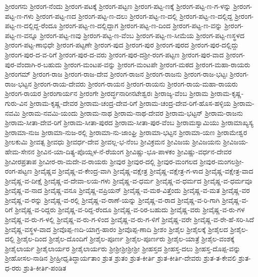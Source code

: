 ಶ್ರೀರಂಗನು
ಶ್ರೀರಂಗ-ನೆಂದು
ಶ್ರೀರಂಗ-ಪಟಕ್ಕೆ
ಶ್ರೀರಂಗ-ಪಟ್ಟಣ
ಶ್ರೀರಂಗ-ಪಟ್ಟ-ಣಕ್ಕೆ
ಶ್ರೀರಂಗ-ಪಟ್ಟ-ಣ-ಗ-ಳನ್ನು
ಶ್ರೀರಂಗ-ಪಟ್ಟ-ಣ-ಗಳು
ಶ್ರೀರಂಗ-ಪಟ್ಟ-ಣದ
ಶ್ರೀರಂಗ-ಪಟ್ಟ-ಣ-ದಲು
ಶ್ರೀರಂಗ-ಪಟ್ಟ-ಣ-ದಲ್ಲಿ
ಶ್ರೀರಂಗ-ಪಟ್ಟ-ಣ-ದಲ್ಲಿದ್ದ
ಶ್ರೀರಂಗ-ಪಟ್ಟ-ಣ-ದಲ್ಲಿದ್ದ-ರೆಂದೂ
ಶ್ರೀರಂಗ-ಪಟ್ಟ-ಣ-ದಲ್ಲಿದ್ದಾಗ
ಶ್ರೀರಂಗ-ಪಟ್ಟ-ಣ-ದಿಂದ
ಶ್ರೀರಂಗ-ಪಟ್ಟ-ಣ-ವನ್ನು
ಶ್ರೀರಂಗ-ಪಟ್ಟ-ಣ-ವನ್ನೂ
ಶ್ರೀರಂಗ-ಪಟ್ಟ-ಣವು
ಶ್ರೀರಂಗ-ಪಟ್ಟ-ಣ-ವೆಂಬ
ಶ್ರೀರಂಗ-ಪಟ್ಟ-ಣ-ಸೀಮೆಯ
ಶ್ರೀರಂಗ-ಪಟ್ಟ-ಣಸ್ಥಳದ
ಶ್ರೀರಂಗ-ಪಟ್ಟ-ಣಾಭಿಧೇ
ಶ್ರೀರಂಗ-ಪಟ್ಟಣೇ
ಶ್ರೀರಂಗ-ಪುದ
ಶ್ರೀರಂಗ-ಪುರ
ಶ್ರೀರಂಗ-ಪುರದ
ಶ್ರೀರಂಗ-ಪುರ-ದಲ್ಲಿದ್ದು
ಶ್ರೀರಂಗ-ಪುರ-ದ-ವ-ರಿಗೆ
ಶ್ರೀರಂಗ-ಪುರ-ದ-ವರು
ಶ್ರೀರಂಗ-ಪುರ-ದಶ್ರೀ-ರಂಗ-ಪಟ್ಟಣ
ಶ್ರೀರಂಗ-ಪುರ-ವಾದ
ಶ್ರೀರಂಗ-ಪುರ-ವೆಂದಾಗಿ-ರ-ಬಹುದು
ಶ್ರೀರಂಗ-ಮಂಟಪ-ವನ್ನು
ಶ್ರೀರಂಗ-ಮಂಟಪೇ
ಶ್ರೀರಂಗ-ಮಠದ
ಶ್ರೀರಂಗ-ಮಹಾ-ರಾಯರು
ಶ್ರೀರಂಗಮ್
ಶ್ರೀರಂಗ-ರಾಜ
ಶ್ರೀರಂಗ-ರಾಜ-ದೇವ
ಶ್ರೀರಂಗ-ರಾಜನ
ಶ್ರೀರಂಗ-ರಾಜನು
ಶ್ರೀರಂಗ-ರಾಜ-ಭಟ್ಟಃ
ಶ್ರೀರಂಗ-ರಾಜ-ಭಟ್ಟನ
ಶ್ರೀರಂಗ-ರಾಯ-ದೇವರು
ಶ್ರೀರಂಗ-ರಾಯನ
ಶ್ರೀರಂಗ-ರಾಯನು
ಶ್ರೀರಂಗ-ರಾಯ-ಮಹಾ-ರಾಯರು
ಶ್ರೀರಂಗ-ರಾಯರ
ಶ್ರೀರಂಗಾರ್ಯನ
ಶ್ರೀರಂಗೇ
ಶ್ರೀರರ್ದ್ಧನಾರೀನಟೇಶ್ವರಃ
ಶ್ರೀರಾಜ್ಯ-ವೆಂಬ
ಶ್ರೀರಾಮ
ಶ್ರೀರಾಮ-ಕೃಷ್ಣ-ಗುರು-ವಿನ
ಶ್ರೀರಾಮ-ಕೃಷ್ಣ-ದೇವರ
ಶ್ರೀರಾಮ-ಚಂದ್ರ-ದೇವ-ರಿಗೆ
ಶ್ರೀರಾಮ-ಚಂದ್ರ-ದೇವ-ರಿಗೆ-ಹೊಸ-ಹಳ್ಳಿಯ
ಶ್ರೀರಾಮ-ನವಮಿ
ಶ್ರೀರಾಮ-ನವಮಿ-ಯಂದು
ಶ್ರೀರಾಮ-ನಾಥ
ಶ್ರೀರಾಮ-ನಾಥ-ದೇವರ
ಶ್ರೀರಾಮ-ಭಟ್ಟನ್
ಶ್ರೀರಾಮ-ರಾಜನು
ಶ್ರೀರಾಮ-ಸೀತಾ-ದೇವ-ರಿಗೆ
ಶ್ರೀರಾಮ-ಸೀತಾ-ಪುರದ
ಶ್ರೀರಾಮ-ಸೀತಾ-ಪುರ-ವೆಂಬ
ಶ್ರೀರಾಮಸ್ವಾಮಿಯು
ಶ್ರೀರಾಮಾಖ್ಯಸ್ಯ
ಶ್ರೀರಾಮಾ-ನುಜ
ಶ್ರೀರಾಮಾ-ನುಜ-ರಲ್ಲಿ
ಶ್ರೀರಾಮಾ-ನು-ಜಾಂಘ್ರಿ
ಶ್ರೀರಾಮಾ-ಭಟ್ಟನ
ಶ್ರೀರಾಮಾ-ಯಣ
ಶ್ರೀರಾಮೇಶ್ವರ
ಶ್ರೀಲಕುಮಿ
ಶ್ರೀವತ್ಸ
ಶ್ರೀವಧು
ಶ್ರೀವರ್ಧ-ದೇವ
ಶ್ರೀವಲ್ಲ-ಭ-ನೆಂಬ
ಶ್ರೀವಿಕ್ರಮನ
ಶ್ರೀವಿಜಯ
ಶ್ರೀವಿಜಯನು
ಶ್ರೀವಿಜಯ-ಹೇಮ-ಸೇನನ
ಶ್ರೀವಿನ-ಯಾ-ದಿತ್ಯ-ಪೊಯ್ಸಳ-ನೆ-ರೆಯಂಗ
ಶ್ರೀವಿಷ್ಣು-ಭೂ-ಪಾಳಕಂ
ಶ್ರೀವಿಷ್ಣು-ವರ್ಧನ-ದೇವರ
ಶ್ರೀವೀರಪ್ರತಾಪ
ಶ್ರೀವೀರ-ರಾ-ಮದೇ-ವ-ರಾಯರು
ಶ್ರೀವುರ
ಶ್ರೀವುರ-ದಲ್ಲಿ
ಶ್ರೀವುರ-ಮಂಗಲದ
ಶ್ರೀವುರ-ಮಂಗಲಶ್ರೀ-ರಂಗ-ಪಟ್ಟಣ
ಶ್ರೀವೈಷ್ಣವ
ಶ್ರೀವೈಷ್ಣ-ವ-ಕೇಂದ್ರ-ವಾಗಿ
ಶ್ರೀವೈಷ್ಣ-ವಕ್ಷೇತ್ರ
ಶ್ರೀವೈಷ್ಣ-ವಕ್ಷೇತ್ರ-ಗ-ಳಾದ
ಶ್ರೀವೈಷ್ಣ-ವಕ್ಷೇತ್ರ-ವಾದ
ಶ್ರೀವೈಷ್ಣ-ವ-ದೀಕ್ಷೆ
ಶ್ರೀವೈಷ್ಣ-ವ-ದೇವಾ-ಲಯ-ಗಳು
ಶ್ರೀವೈಷ್ಣ-ವ-ಧರ್ಮ
ಶ್ರೀವೈಷ್ಣ-ವ-ಧರ್ಮದ
ಶ್ರೀವೈಷ್ಣ-ವ-ಧರ್ಮವೂ
ಶ್ರೀವೈಷ್ಣ-ವ-ನಾದ
ಶ್ರೀವೈಷ್ಣ-ವನೂ
ಶ್ರೀವೈಷ್ಣ-ವಪ್ರಿಯನ್
ಶ್ರೀವೈಷ್ಣ-ವ-ಮಠ-ವಿತ್ತೆಂದು
ಶ್ರೀವೈಷ್ಣ-ವ-ಮತ
ಶ್ರೀವೈಷ್ಣ-ವರ
ಶ್ರೀವೈಷ್ಣ-ವ-ರನ್ನು
ಶ್ರೀವೈಷ್ಣ-ವ-ರಲ್ಲಿ
ಶ್ರೀವೈಷ್ಣ-ವ-ರಾಣೆ-ಯನ್ನು
ಶ್ರೀವೈಷ್ಣ-ವ-ರಾದ
ಶ್ರೀವೈಷ್ಣ-ವ-ರಿ-ಗಾಗಿ
ಶ್ರೀವೈಷ್ಣ-ವ-ರಿಗೆ
ಶ್ರೀವೈಷ್ಣ-ವ-ರಿದ್ದರು
ಶ್ರೀವೈಷ್ಣ-ವ-ರಿದ್ದ-ರೆಂದೂ
ಶ್ರೀವೈಷ್ಣ-ವ-ರಿರ-ಬಹುದು
ಶ್ರೀವೈಷ್ಣ-ವರು
ಶ್ರೀವೈಷ್ಣ-ವ-ರು-ಗಳ
ಶ್ರೀವೈಷ್ಣ-ವ-ರು-ಗ-ಳಲ್ಲಿ
ಶ್ರೀವೈಷ್ಣ-ವ-ರು-ಗ-ಳಿಂದ
ಶ್ರೀವೈಷ್ಣ-ವ-ರು-ಗ-ಳಿಗೆ
ಶ್ರೀವೈಷ್ಣ-ವರೇ
ಶ್ರೀವೈಷ್ಣ-ವ-ರೇ-ಹೆ-ಸರಿ-ಸಿದೆ
ಶ್ರೀವೈಷ್ಣ-ವಸ್ಥಳ-ವಾದ
ಶ್ರೀವೊಪ್ಪ-ಣದಿ-ಯಾಗ್ರ-ಹಾರಂ
ಶ್ರೀವೊಪ್ಪ-ಣಾದಿ
ಶ್ರೀಶಂ
ಶ್ರೀಶೈಲ
ಶ್ರೀಶೈಲಕ್ಕೆ
ಶ್ರೀಶೈಲದ
ಶ್ರೀಶೈಲ-ದಲ್ಲಿ
ಶ್ರೀಶೈಲ-ದಿಂದ
ಶ್ರೀಶೈಲ-ದೊಂದಿಗೆ
ಶ್ರೀಶೈಲ-ಪೂರ್ಣ
ಶ್ರೀಶೈಲ-ಪೂರ್ಣರು
ಶ್ರೀಶೈಲ-ಯಾತ್ರೆ
ಶ್ರೀಶೈಲ-ವಂಶಕ್ಕೆ
ಶ್ರೀಶೈಲಾರ್ಯ
ಶ್ರೀಶೈಲಾರ್ಯರ
ಶ್ರೀಶೈಲಾರ್ಯರು
ಶ್ರೀಶ್ರೀಶ್ರೀಶ್ರೀಶ್ರೀ
ಶ್ರೀಹಸ್ತದ
ಶ್ರೀಹಸ್ತ-ದಲು
ಶ್ರೀಹಸ್ತ-ದೊಪ್ಪ-ವನ್ನು
ಶ್ರೀಹೋಸಲ-ನಾಡಿನ
ಶ್ರೀಹ್ರೀಧೃತಿದ್ಧಾರ್ಯತಾಂ
ಶ್ರುತ
ಶ್ರುತಂ
ಶ್ರುತ-ಕೀರ್ತಿ
ಶ್ರುತ-ಕೀರ್ತಿ-ದೇವರು
ಶ್ರುತ-ತ-ಕೇವಲಿ
ಶ್ರುತ-ಧ-ರರು
ಶ್ರುತಿ-ಕೀರ್ತಿ-ಪಂಡಿತ
